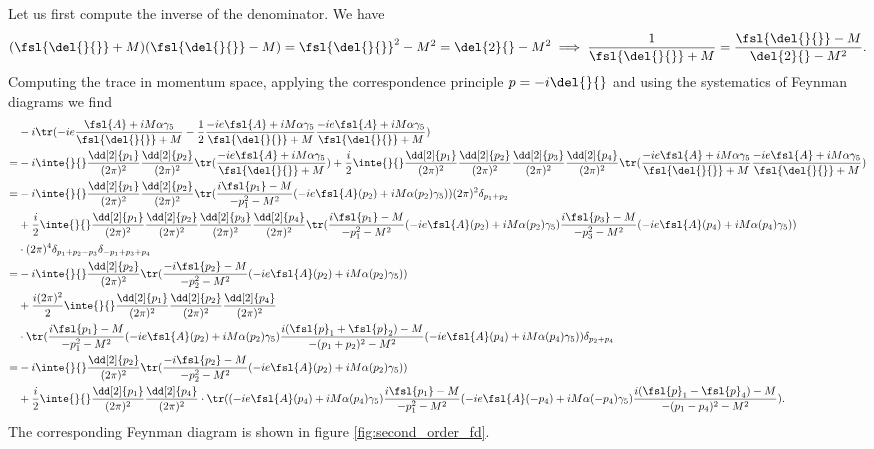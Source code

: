 Let us first compute the inverse of the denominator. We have
\begin{align*}
	(\fsl{\del{}{}} + M)(\fsl{\del{}{}} - M) = \fsl{\del{}{}}^{2} - M^{2} = \del{2}{} - M^{2} \implies \frac{1}{\fsl{\del{}{}} + M} = \frac{\fsl{\del{}{}} - M}{\del{2}{} - M^{2}}.
\end{align*}
Computing the trace in momentum space, applying the correspondence principle $p = -i\del{}{}$ and using the systematics of Feynman diagrams we find
\begin{align*}
	 &-i\tr(-ie\frac{\fsl{A} + iM\alpha\gamma_{5}}{\fsl{\del{}{}} + M} - \frac{1}{2}\frac{-ie\fsl{A} + iM\alpha\gamma_{5}}{\fsl{\del{}{}} + M}\frac{-ie\fsl{A} + iM\alpha\gamma_{5}}{\fsl{\del{}{}} + M}) \\
	=& -i\inte{}{}\frac{\dd[2]{p_{1}}}{(2\pi)^{2}}\frac{\dd[2]{p_{2}}}{(2\pi)^{2}}\tr(\frac{-ie\fsl{A} + iM\alpha\gamma_{5}}{\fsl{\del{}{}} + M}) + \frac{i}{2}\inte{}{}\frac{\dd[2]{p_{1}}}{(2\pi)^{2}}\frac{\dd[2]{p_{2}}}{(2\pi)^{2}}\frac{\dd[2]{p_{3}}}{(2\pi)^{2}}\frac{\dd[2]{p_{4}}}{(2\pi)^{2}}\tr(\frac{-ie\fsl{A} + iM\alpha\gamma_{5}}{\fsl{\del{}{}} + M}\frac{-ie\fsl{A} + iM\alpha\gamma_{5}}{\fsl{\del{}{}} + M}) \\
	=& -i\inte{}{}\frac{\dd[2]{p_{1}}}{(2\pi)^{2}}\frac{\dd[2]{p_{2}}}{(2\pi)^{2}}\tr(\frac{i\fsl{p_{1}} - M}{-p_{1}^{2} - M^{2}}(-ie\fsl{A}(p_{2}) + iM\alpha(p_{2})\gamma_{5}))(2\pi)^{2}\delta_{p_{1} + p_{2}} \\
	 &+ \frac{i}{2}\inte{}{}\frac{\dd[2]{p_{1}}}{(2\pi)^{2}}\frac{\dd[2]{p_{2}}}{(2\pi)^{2}}\frac{\dd[2]{p_{3}}}{(2\pi)^{2}}\frac{\dd[2]{p_{4}}}{(2\pi)^{2}}\tr(\frac{i\fsl{p_{1}} - M}{-p_{1}^{2} - M^{2}}(-ie\fsl{A}(p_{2}) + iM\alpha(p_{2})\gamma_{5})\frac{i\fsl{p_{3}} - M}{-p_{3}^{2} - M^{2}}(-ie\fsl{A}(p_{4}) + iM\alpha(p_{4})\gamma_{5})) \\
	 &\cdot(2\pi)^{4}\delta_{p_{1} + p_{2} - p_{3}}\delta_{-p_{1} + p_{3} + p_{4}} \\
	=& -i\inte{}{}\frac{\dd[2]{p_{2}}}{(2\pi)^{2}}\tr(\frac{-i\fsl{p_{2}} - M}{-p_{2}^{2} - M^{2}}(-ie\fsl{A}(p_{2}) + iM\alpha(p_{2})\gamma_{5})) \\
	 &+ \frac{i(2\pi)^{2}}{2}\inte{}{}\frac{\dd[2]{p_{1}}}{(2\pi)^{2}}\frac{\dd[2]{p_{2}}}{(2\pi)^{2}}\frac{\dd[2]{p_{4}}}{(2\pi)^{2}} \\
	 &\cdot\tr(\frac{i\fsl{p_{1}} - M}{-p_{1}^{2} - M^{2}}(-ie\fsl{A}(p_{2}) + iM\alpha(p_{2})\gamma_{5})\frac{i(\fsl{p}_{1} + \fsl{p}_{2}) - M}{-(p_{1} + p_{2})^{2} - M^{2}}(-ie\fsl{A}(p_{4}) + iM\alpha(p_{4})\gamma_{5}))\delta_{p_{2} + p_{4}} \\
	=&  -i\inte{}{}\frac{\dd[2]{p_{2}}}{(2\pi)^{2}}\tr(\frac{-i\fsl{p_{2}} - M}{-p_{2}^{2} - M^{2}}(-ie\fsl{A}(p_{2}) + iM\alpha(p_{2})\gamma_{5})) \\
	&+ \frac{i}{2}\inte{}{}\frac{\dd[2]{p_{1}}}{(2\pi)^{2}}\frac{\dd[2]{p_{4}}}{(2\pi)^{2}}\cdot\tr((-ie\fsl{A}(p_{4}) + iM\alpha(p_{4})\gamma_{5})\frac{i\fsl{p_{1}} - M}{-p_{1}^{2} - M^{2}}(-ie\fsl{A}(-p_{4}) + iM\alpha(-p_{4})\gamma_{5})\frac{i(\fsl{p}_{1} - \fsl{p}_{4}) - M}{-(p_{1} - p_{4})^{2} - M^{2}}).
\end{align*}
The corresponding Feynman diagram is shown in figure \ref{fig:second_order_fd}.

